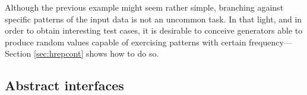 


Although the previous example might seem rather simple, branching against
specific patterns of the input data is not an uncommon task.
%
In that light, and in order to obtain interesting test cases, it is desirable to
conceive generators able to produce random values capable of exercising patterns
with certain frequency---Section \ref{sec:hrepcont} shows how to do so.



\subsection{Abstract interfaces}

